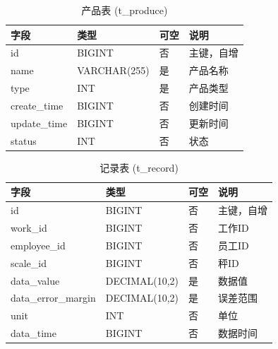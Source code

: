 \documentclass{xduugmr}
\begin{document}
\begin{table}[H]
    \centering
    \caption{产品表 (t\_produce)}
    \begin{tabular}{|l|l|l|l|}
        \hline
        \textbf{字段} & \textbf{类型} & \textbf{可空} & \textbf{说明} \\
        \hline
        id & BIGINT & 否 & 主键，自增 \\
        name & VARCHAR(255) & 是 & 产品名称 \\
        type & INT & 是 & 产品类型 \\
        create\_time & BIGINT & 否 & 创建时间 \\
        update\_time & BIGINT & 否 & 更新时间 \\
        status & INT & 否 & 状态 \\
        \hline
    \end{tabular}
\end{table}

\begin{table}[H]
    \centering
    \caption{记录表 (t\_record)}
    \begin{tabular}{|l|l|l|l|}
        \hline
        \textbf{字段} & \textbf{类型} & \textbf{可空} & \textbf{说明} \\
        \hline
        id & BIGINT & 否 & 主键，自增 \\
        work\_id & BIGINT & 否 & 工作ID \\
        employee\_id & BIGINT & 否 & 员工ID \\
        scale\_id & BIGINT & 否 & 秤ID \\
        data\_value & DECIMAL(10,2) & 是 & 数据值 \\
        data\_error\_margin & DECIMAL(10,2) & 是 & 误差范围 \\
        unit & INT & 否 & 单位 \\
        data\_time & BIGINT & 否 & 数据时间 \\
        \hline
    \end{tabular}
\end{table}
\end{document}
